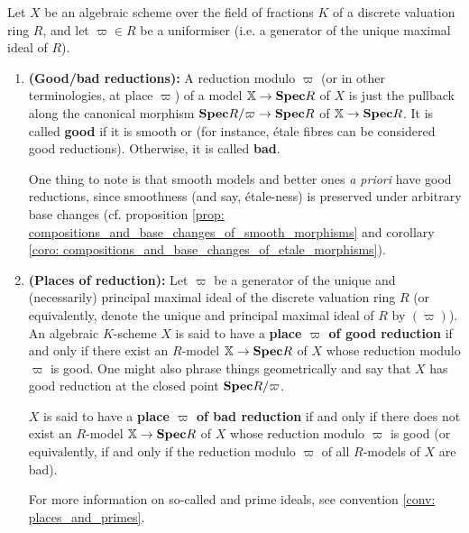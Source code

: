                     \begin{definition} \label{def: reductions}
                        Let $X$ be an algebraic scheme over the field of fractions $K$ of a discrete valuation ring $R$, and let $\varpi \in R$ be a uniformiser (i.e. a generator of the unique maximal ideal of $R$). 
                        \begin{enumerate}
                            \item \textbf{(Good/bad reductions):} A reduction modulo $\varpi$ (or in other terminologies, at place $\varpi$) of a model $\mathbb{X} \to \mathbf{Spec} R$ of $X$ is just the pullback along the canonical morphism $\mathbf{Spec} R/\varpi \to \mathbf{Spec} R$ of $\mathbb{X} \to \mathbf{Spec} R$. It is called \textbf{good} if it is smooth or  (for instance, \'etale fibres can be considered good reductions). Otherwise, it is called \textbf{bad}.
                            
                            One thing to note is that smooth models and better ones \textit{a priori} have good reductions, since smoothness (and say, \'etale-ness) is preserved under arbitrary base changes (cf. proposition \ref{prop: compositions_and_base_changes_of_smooth_morphisms} and corollary \ref{coro: compositions_and_base_changes_of_etale_morphisms}).
                            \item \textbf{(Places of reduction):} Let $\varpi$ be a generator of the unique and (necessarily) principal maximal ideal of the discrete valuation ring $R$ (or equivalently, denote the unique and principal maximal ideal of $R$ by $(\varpi)$). An algebraic $K$-scheme $X$ is said to have a \textbf{place $\varpi$ of good reduction} if and only if there exist an $R$-model $\mathbb{X} \to \mathbf{Spec} R$ of $X$ whose reduction modulo $\varpi$ is good. One might also phrase things geometrically and say that $X$ has good reduction at the closed point $\mathbf{Spec} R/\varpi$.
                            
                            $X$ is said to have a \textbf{place $\varpi$ of bad reduction} if and only if there does not exist an $R$-model $\mathbb{X} \to \mathbf{Spec} R$ of $X$ whose reduction modulo $\varpi$ is good (or equivalently, if and only if the reduction modulo $\varpi$ of all $R$-models of $X$ are bad).
                            
                            For more information on so-called  and prime ideals, see convention \ref{conv: places_and_primes}.
                        \end{enumerate}
                    \end{definition}
